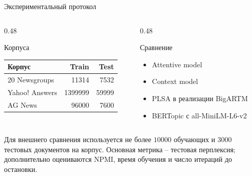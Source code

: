 \documentclass[aspectratio=169]{beamer}
\newcommand{\model}{Attentive model}
\newcommand{\contextmodel}{Context model}
\newcommand{\plsa}{PLSA}
\newcommand{\bertopic}{BERTopic}
\begin{document}
\begin{frame}{Экспериментальный протокол}
    \begin{columns}[T]
        \begin{column}{0.48\textwidth}
            \begin{block}{Корпуса}
                \begin{tabular}{@{}lrr@{}}
                    \toprule
                    Корпус & Train & Test\\
                    \midrule
                    20 Newsgroups & 11314 & 7532\\
                    Yahoo! Answers & 1399999 & 59999\\
                    AG News & 96000 & 7600\\
                    \bottomrule
                \end{tabular}
            \end{block}
        \end{column}
        \begin{column}{0.48\textwidth}
            \begin{block}{Сравнение}
                \begin{itemize}
                    \item \model
                    \item \contextmodel
                    \item \plsa{} в реализации BigARTM
                    \item \bertopic{} с all-MiniLM-L6-v2
                \end{itemize}
            \end{block}
        \end{column}
    \end{columns}

    \vspace{0.25cm}
    Для внешнего сравнения используется не более \(10000\) обучающих и
    \(3000\) тестовых документов на корпус. Основная метрика -- тестовая
    перплексия; дополнительно оцениваются NPMI, время обучения и число
    итераций до остановки.
\end{frame}
\end{document}
